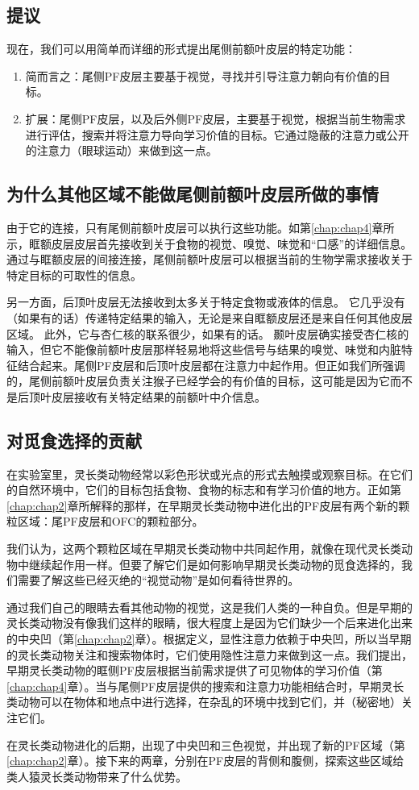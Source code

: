 \subsection{提议}

现在，我们可以用简单而详细的形式提出尾侧前额叶皮层的特定功能：

\begin{enumerate}
	\item 简而言之：尾侧PF皮层主要基于视觉，寻找并引导注意力朝向有价值的目标。
	\item 扩展：尾侧PF皮层，以及后外侧PF皮层，主要基于视觉，根据当前生物需求进行评估，搜索并将注意力导向学习价值的目标。它通过隐蔽的注意力或公开的注意力（眼球运动）来做到这一点。
\end{enumerate}



\subsection{为什么其他区域不能做尾侧前额叶皮层所做的事情}

由于它的连接，只有尾侧前额叶皮层可以执行这些功能。如第\ref{chap:chap4}章所示，眶额皮层皮层首先接收到关于食物的视觉、嗅觉、味觉和“口感”的详细信息。
通过与眶额皮层的间接连接，尾侧前额叶皮层可以根据当前的生物学需求接收关于特定目标的可取性的信息。


另一方面，后顶叶皮层无法接收到太多关于特定食物或液体的信息。
它几乎没有（如果有的话）传递特定结果的输入，无论是来自眶额皮层还是来自任何其他皮层区域。
此外，它与杏仁核的联系很少，如果有的话。
颞叶皮层确实接受杏仁核的输入，但它不能像前额叶皮层那样轻易地将这些信号与结果的嗅觉、味觉和内脏特征结合起来。尾侧PF皮层和后顶叶皮层都在注意力中起作用。但正如我们所强调的，尾侧前额叶皮层负责关注猴子已经学会的有价值的目标，这可能是因为它而不是后顶叶皮层接收有关特定结果的前额叶中介信息。
\subsection{对觅食选择的贡献}
在实验室里，灵长类动物经常以彩色形状或光点的形式去触摸或观察目标。在它们的自然环境中，它们的目标包括食物、食物的标志和有学习价值的地方。正如第\ref{chap:chap2}章所解释的那样，在早期灵长类动物中进化出的PF皮层有两个新的颗粒区域：尾PF皮层和OFC的颗粒部分。

我们认为，这两个颗粒区域在早期灵长类动物中共同起作用，就像在现代灵长类动物中继续起作用一样。但要了解它们是如何影响早期灵长类动物的觅食选择的，我们需要了解这些已经灭绝的“视觉动物”是如何看待世界的。

通过我们自己的眼睛去看其他动物的视觉，这是我们人类的一种自负。但是早期的灵长类动物没有像我们这样的眼睛，很大程度上是因为它们缺少一个后来进化出来的中央凹（第\ref{chap:chap2}章）。根据定义，显性注意力依赖于中央凹，所以当早期的灵长类动物关注和搜索物体时，它们使用隐性注意力来做到这一点。我们提出，早期灵长类动物的眶侧PF皮层根据当前需求提供了可见物体的学习价值（第\ref{chap:chap4}章）。当与尾侧PF皮层提供的搜索和注意力功能相结合时，早期灵长类动物可以在物体和地点中进行选择，在杂乱的环境中找到它们，并（秘密地）关注它们。

在灵长类动物进化的后期，出现了中央凹和三色视觉，并出现了新的PF区域（第\ref{chap:chap2}章）。接下来的两章，分别在PF皮层的背侧和腹侧，探索这些区域给类人猿灵长类动物带来了什么优势。